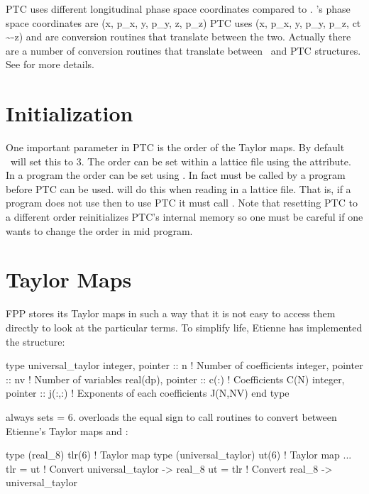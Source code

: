 PTC uses different longitudinal phase space coordinates compared to \bmad.
\bmad's phase space coordinates are
\Begineq
  (x, p_x, y, p_y, z, p_z)
\Endeq
PTC uses
\Begineq
  (x, p_x, y, p_y, p_z, ct \sim -z)
\Endeq
{} and  are conversion routines
that translate between the two. Actually there are a number of
conversion routines that translate between \bmad\ and PTC
structures. See  for more details.

\section{Initialization}
\label{s:etienne.init}

One important parameter in PTC is the order of the Taylor maps.
By default \bmad\ will set this to 3. The order can be set within
a lattice file using the  attribute.
In a program the order can be set using . In fact
 must be called by a program before PTC can be used.
 will do this when reading in a lattice file.
That is, if a program does not use  then to use PTC it
must call . Note that resetting PTC to a different order
reinitializes PTC's internal memory so one must be careful if one wants
to change the order in mid program.

\section{Taylor Maps}
\label{s:etienne.taylor}

FPP stores its  Taylor maps in such a way that it is not easy to access them
directly to look at the particular terms. To simplify life, Etienne has 
implemented the structure:
\begin{example}
  type universal_taylor
    integer, pointer  :: n       ! Number of coefficients
    integer, pointer  :: nv      ! Number of variables
    real(dp), pointer :: c(:)    ! Coefficients C(N)
    integer, pointer  :: j(:,:)  ! Exponents of each coefficients J(N,NV)
  end type
\end{example}
\bmad always sets  = 6. \bmad overloads the equal sign to call 
routines to convert between Etienne's
 Taylor maps and :
\begin{example}
  type (real_8) tlr(6)           ! Taylor map
  type (universal_taylor) ut(6)  ! Taylor map
  ...
  tlr = ut                       ! Convert universal_taylor -> real_8
  ut = tlr                       ! Convert real_8 -> universal_taylor
\end{example}